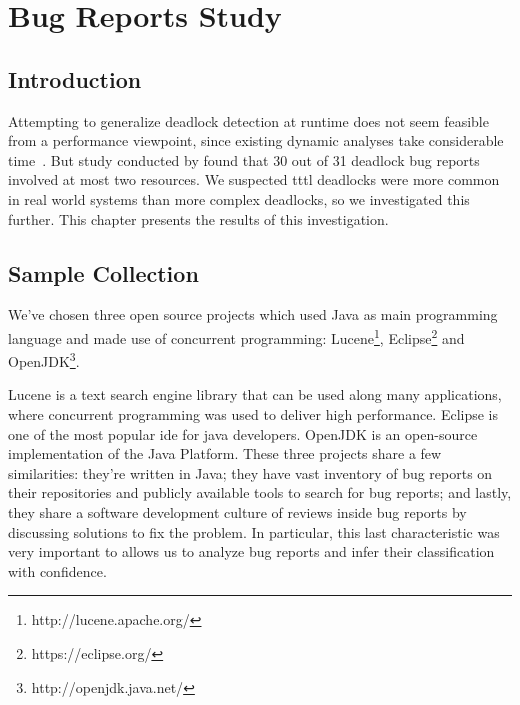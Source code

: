 \chapter{Bug Reports Study}\label{bugs}

\section{Introduction}

Attempting to generalize deadlock detection at runtime does not seem feasible from a performance viewpoint, since existing dynamic analyses take considerable time~\citep{magicfuzzer}. But study conducted by \citet{lu} found that 30 out of 31 deadlock bug reports involved at most two resources. We suspected \ac{tttl} deadlocks were more common in real world systems than more complex deadlocks, so we investigated this further. This chapter presents the results of this investigation.

\section{Sample Collection}

We've chosen three open source projects which used Java as main programming language and made use of concurrent programming: Lucene\footnote{http://lucene.apache.org/}, Eclipse\footnote{https://eclipse.org/} and OpenJDK\footnote{http://openjdk.java.net/}.

Lucene is a text search engine library that can be used along many applications, where concurrent programming was used to deliver high performance. Eclipse is one of the most popular \ac{ide} for java developers. OpenJDK is an open-source implementation of the Java Platform. These three projects share a few similarities: they're written in Java; they have vast inventory of bug reports on their repositories and publicly available tools to search for bug reports; and lastly, they share a software development culture of reviews inside bug reports by discussing solutions to fix the problem. In particular, this last characteristic was very important to allows us to analyze bug reports and infer their classification with confidence.

